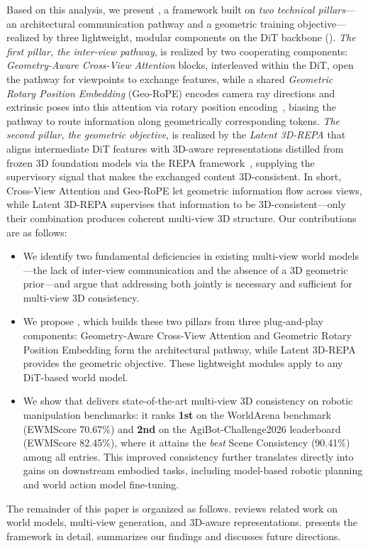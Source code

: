 Based on this analysis, we present \textbf{\methodname{}}, a framework built on \emph{two technical pillars}---an architectural communication pathway and a geometric training objective---realized by three lightweight, modular components on the DiT backbone (). \emph{The first pillar, the inter-view pathway}, is realized by two cooperating components: \emph{Geometry-Aware Cross-View Attention} blocks, interleaved within the DiT, open the pathway for viewpoints to exchange features, while a shared \emph{Geometric Rotary Position Embedding} (Geo-RoPE) encodes camera ray directions and extrinsic poses into this attention via rotary position encoding~\cite{su2024rope,he2024cameractrl}, biasing the pathway to route information along geometrically corresponding tokens. \emph{The second pillar, the geometric objective}, is realized by the \emph{Latent 3D-REPA} that aligns intermediate DiT features with 3D-aware representations distilled from frozen 3D foundation models via the REPA framework~\cite{yu2024repa}, supplying the supervisory signal that makes the exchanged content 3D-consistent.  In short, Cross-View Attention and Geo-RoPE let geometric information flow across views, while Latent 3D-REPA supervises that information to be 3D-consistent---only their combination produces coherent multi-view 3D structure. Our contributions are as follows:
\begin{itemize}
	\item We identify two fundamental deficiencies in existing multi-view world models---the lack of inter-view communication and the absence of a 3D geometric prior---and argue that addressing both jointly is necessary and sufficient for multi-view 3D consistency.
	\item We propose \methodname{}, which builds these two pillars from three plug-and-play components: Geometry-Aware Cross-View Attention and Geometric Rotary Position Embedding form the architectural pathway, while Latent 3D-REPA provides the geometric objective. These lightweight modules apply to any DiT-based world model.
	\item We show that \methodname{} delivers state-of-the-art multi-view 3D consistency on robotic manipulation benchmarks: it ranks \textbf{1st} on the WorldArena benchmark (EWMScore 70.67\%) and \textbf{2nd} on the AgiBot-Challenge2026 leaderboard (EWMScore 82.45\%), where it attains the \emph{best} Scene Consistency (90.41\%) among all entries. This improved consistency further translates directly into gains on downstream embodied tasks, including model-based robotic planning and world action model fine-tuning.
\end{itemize}

The remainder of this paper is organized as follows.  reviews related work on world models, multi-view generation, and 3D-aware representations.  presents the \methodname{} framework in detail.  summarizes our findings and discusses future directions.

